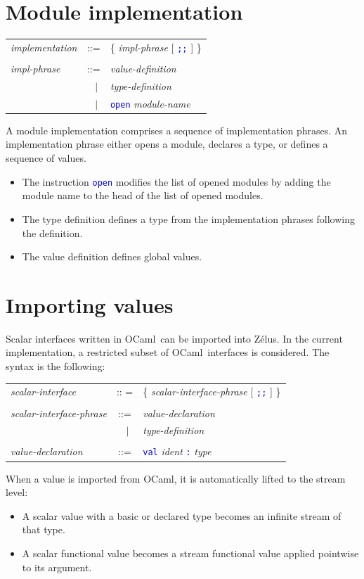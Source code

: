 \documentclass[11pt,titlepage,twoside]{report}
\newcommand{\zelus}{{\sf Z\'elus}}
\newcommand{\ocaml}{{\sf OCaml}}
\newcommand{\alt}{\;|\;}
\newcommand{\Semisemi}{\mbox{{\tt ;;}}}
\newcommand{\term}[1]{\textcolor{Blue}{\tt #1}}
\newcommand{\nterm}[1]{\textcolor{BrickRed}{\it #1}}
\newcommand{\term}[1]{{\tt #1}}
\newcommand{\nterm}[1]{{\em #1}}
\begin{document}
\section{Module implementation\label{moduleimpl}} %
\begin{center}
\begin{tabular}{lcl}
\nterm{implementation}
  & ::=        & \{ \nterm{impl-phrase} [ \term{;;} ] \} 
\\ \\
\nterm{impl-phrase}
  & ::=        & \nterm{value-definition} \\ 
  & $\;\;\alt$ & \nterm{type-definition} \\
  & $\;\;\alt$ & \term{open} \nterm{module-name} 
\end{tabular}
\end{center}
A module implementation comprises a sequence of implementation
phrases. An implementation phrase either opens a module, declares a type, or 
defines a sequence of values.
\begin{itemize}
\item
The instruction \term{open} modifies the list of opened modules by adding 
the module name to the head of the list of opened modules.

\item
The type definition defines a type from the implementation
phrases following the definition.

\item
The value definition defines global values.
\end{itemize}

\section{Importing values\label{importing}} %

Scalar interfaces written in \ocaml\ can be imported into \zelus.
In the current implementation, a restricted subset of \ocaml\ interfaces is
considered. The syntax is the following:
\begin{center}
\begin{tabular}{lcl}
\nterm{scalar-interface}
  & :: =   & \{ \nterm{scalar-interface-phrase} [ \term{\Semisemi} ] \} 
\\ \\
\nterm{scalar-interface-phrase}
  & ::=        & \nterm{value-declaration} \\
  & $\;\;\alt$ & \nterm{type-definition}
\\ \\
\nterm{value-declaration}
  & ::=        & \term{val} \nterm{ident} \term{:} \nterm{type}
\end{tabular}
\end{center}
When a value is imported from \ocaml, it
is automatically lifted to the stream level:
\begin{itemize}
\item
A scalar value with a basic or declared type becomes an infinite stream of 
that type.

\item
A scalar functional value becomes a stream functional value
applied pointwise to its argument.
\end{itemize}
\end{document}
